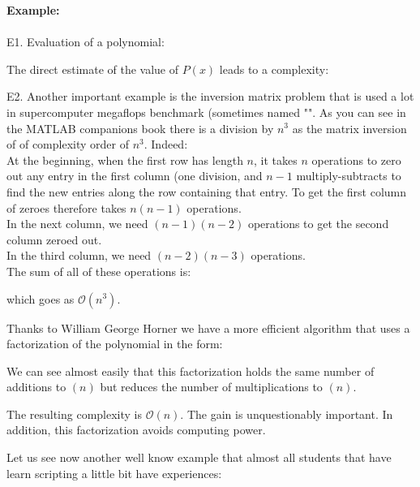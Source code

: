 	\begin{tcolorbox}[colframe=black,colback=white,sharp corners]
\textbf{{\Large {}}Example:}\\\\
	E1. Evaluation of a polynomial:
	
	The direct estimate of the value of $P(x)$ leads to a complexity:
	
	E2. Another important example is the inversion matrix problem that is used a lot in supercomputer megaflops benchmark (sometimes named "". As you can see in the MATLAB companions book there is a division by $n^3$ as the matrix inversion of of complexity order of $n^3$. Indeed:\\
	
	At the beginning, when the first row has length $n$, it takes $n$ 
   operations to zero out any entry in the first column (one division, 
   and $n-1$ multiply-subtracts to find the new entries along the row 
   containing that entry. To get the first column of zeroes therefore 
   takes $n(n-1)$ operations.\\
   
    In the next column, we need $(n-1)(n-2)$ operations to get the second 
   column zeroed out.\\

   In the third column, we need $(n-2)(n-3)$ operations.\\
   
   The sum of all of these operations is:
   
	which goes as $\mathcal{O}(n^3)$. 
	
	\end{tcolorbox}
	Thanks to William George Horner we have a more efficient algorithm that uses a factorization of the polynomial in the form:
	
We can see almost easily that this factorization holds the same number of additions to $(n)$ but reduces the number of multiplications to $(n)$.

The resulting complexity is $\mathcal{O} (n)$. The gain is unquestionably important. In addition, this  factorization avoids computing power.

Let us see now another well know example that almost all students that have learn scripting a little bit have experiences:

